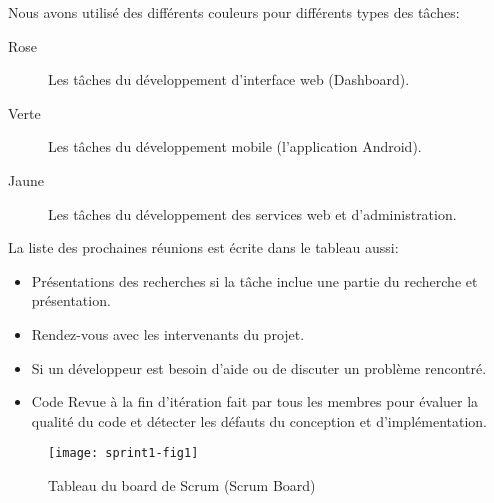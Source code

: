 Nous avons utilisé des différents couleurs pour différents types des tâches:

\begin{description}
    \item [Rose] Les tâches du développement d'interface web (Dashboard).
    \item [Verte] Les tâches du développement mobile (l'application Android).
    \item [Jaune] Les tâches du développement des services web et
        d'administration.
\end{description}

La liste des prochaines réunions est écrite dans le tableau aussi:

\begin{itemize}
    \item Présentations des recherches si la tâche inclue une partie du
        recherche et présentation.
    \item Rendez-vous avec les intervenants du projet.
    \item Si un développeur est besoin d'aide ou de discuter un problème
        rencontré.
    \item Code Revue à la fin d'itération fait par tous les membres pour
        évaluer la qualité du code et détecter les défauts du conception et
        d'implémentation.
\end{itemize}

\begin{figure}[H]
    \centering
    \texttt{[image: sprint1-fig1]}
    \caption{Tableau du board de Scrum (Scrum Board)}
\label{fig:scrum-board}
\end{figure}



